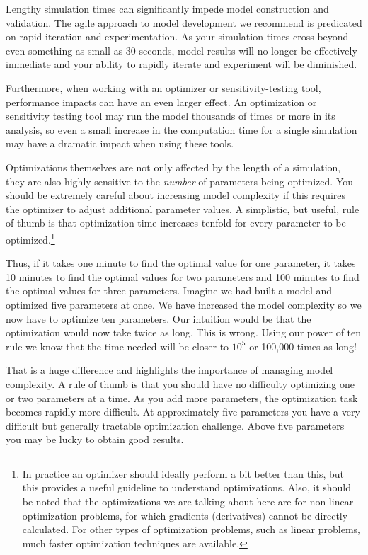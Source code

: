 \documentclass[]{memoir}
\begin{document}
Lengthy simulation times can significantly impede model construction and
validation. The agile approach to model development we recommend is
predicated on rapid iteration and experimentation. As your simulation
times cross beyond even something as small as 30 seconds, model results
will no longer be effectively immediate and your ability to rapidly
iterate and experiment will be diminished.

Furthermore, when working with an optimizer or sensitivity-testing tool,
performance impacts can have an even larger effect. An optimization or
sensitivity testing tool may run the model thousands of times or more in
its analysis, so even a small increase in the computation time for a
single simulation may have a dramatic impact when using these tools.

Optimizations themselves are not only affected by the length of a
simulation, they are also highly sensitive to the \emph{number} of
parameters being optimized. You should be extremely careful about
increasing model complexity if this requires the optimizer to adjust
additional parameter values. A simplistic, but useful, rule of thumb is
that optimization time increases tenfold for every parameter to be
optimized.\footnote{In practice an optimizer should ideally perform a
  bit better than this, but this provides a useful guideline to
  understand optimizations. Also, it should be noted that the
  optimizations we are talking about here are for non-linear
  optimization problems, for which gradients (derivatives) cannot be
  directly calculated. For other types of optimization problems, such as
  linear problems, much faster optimization techniques are available.}

Thus, if it takes one minute to find the optimal value for one
parameter, it takes 10 minutes to find the optimal values for two
parameters and 100 minutes to find the optimal values for three
parameters. Imagine we had built a model and optimized five parameters
at once. We have increased the model complexity so we now have to
optimize ten parameters. Our intuition would be that the optimization
would now take twice as long. This is wrong. Using our power of ten rule
we know that the time needed will be closer to $10^5$ or 100,000 times
as long!

That is a huge difference and highlights the importance of managing
model complexity. A rule of thumb is that you should have no difficulty
optimizing one or two parameters at a time. As you add more parameters,
the optimization task becomes rapidly more difficult. At approximately
five parameters you have a very difficult but generally tractable
optimization challenge. Above five parameters you may be lucky to obtain
good results.
\end{document}
